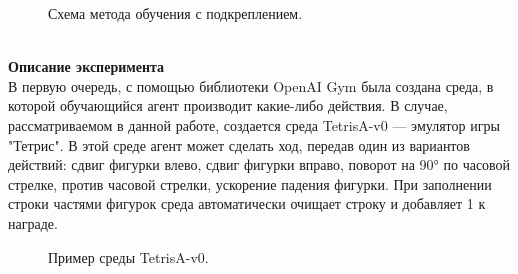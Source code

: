 \documentclass{article}
\begin{document}
\begin{figure}[h]
\caption{Схема метода обучения с подкреплением\cite{litlink19}.}
\label{ris:image}
\end{figure}\\
\textbf{Описание эксперимента}\\
В первую очередь, с помощью библиотеки OpenAI Gym была создана среда, в которой обучающийся агент производит какие-либо действия. В случае, рассматриваемом в данной работе, создается среда TetrisA-v0 — эмулятор игры "Тетрис". В этой среде агент может сделать ход, передав один из вариантов действий: сдвиг фигурки влево, сдвиг фигурки вправо, поворот на 90° по часовой стрелке, против часовой стрелки, ускорение падения фигурки. При заполнении строки частями фигурок среда автоматически очищает строку и добавляет 1 к награде.\\
\begin{figure}[h]
\caption{Пример среды TetrisA-v0.}
\label{ris:image}
\end{figure}\\
\end{document}
